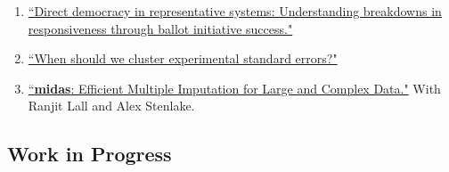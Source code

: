 \documentclass[11pt, a4paper]{article}
\begin{document}
\begin{enumerate}

\item \href{https://ts-robinson.com/publication/robinson-directdemocracyrepresentative-2020/robinson-directdemocracyrepresentative-2020.pdf}{``Direct democracy in representative systems: Understanding breakdowns in responsiveness through ballot initiative success."} 


\item \href{https://ts-robinson.com/publication/robinson-whenshouldwe-2020/robinson-whenshouldwe-2020.pdf}{``When should we cluster experimental standard errors?" }

\item \href{}{``\textbf{midas}: Efficient Multiple Imputation for Large and Complex Data."} With Ranjit Lall and Alex Stenlake.

\end{enumerate}


\subsection*{Work in Progress}
\end{document}

